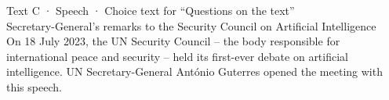 
\geometry{left=22mm,right=58mm,marginparwidth=40mm,marginparsep=6mm}
\usepackage[modulo]{lineno}
\renewcommand{\linenumberfont}{\normalfont\scriptsize\color{muted}}
\setlength{\linenumbersep}{5mm}
\newcommand{\glosse}[1]{\marginpar{\raggedright\footnotesize\color{muted}\setlength{\baselineskip}{9pt}#1}}
\fancyhfoffset[R]{44mm}

\begin{tcolorbox}[enhanced,colback=primtint,colframe=primtint,arc=1.5mm,left=3mm,right=3mm,top=2mm,bottom=2mm,
   width=\linewidth+46mm]
{\headlight\footnotesize\textcolor{prim}{Text C · Speech · Choice text for “Questions on the text”}}\\[0.6mm]
{\headfont\large Secretary-General's remarks to the Security Council on Artificial Intelligence}\\[1mm]
{\small On 18 July 2023, the UN Security Council – the body responsible for international peace and security – held its first-ever debate on artificial intelligence. UN Secretary-General António Guterres opened the meeting with this speech.}
\end{tcolorbox}
\vspace{2mm}
